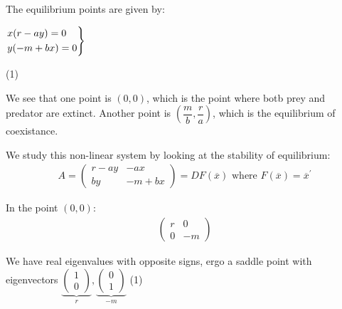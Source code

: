 \pagebreak
\noindent The equilibrium points are given by: \par
$\begin{rcases*}x(r-ay) = 0\\y(-m+bx) = 0\end{rcases*}$
 (1)
\par\bigskip
\noindent We see that one point is $(0,0)$, which is the point where botb prey and predator are extinct. Another point is $\left(\dfrac{m}{b}, \dfrac{r}{a}\right)$, which is the equilibrium of coexistance.
\par\bigskip
\noindent We study this non-linear system by looking at the stability of equilibrium:
\begin{equation*}
  \begin{gathered}
    A = \begin{pmatrix}r-ay&-ax\\by&-m+bx\end{pmatrix} = DF(\overline{x})\text{ where } F(\overline{x}) = \overline{x}^{\prime}
  \end{gathered}
\end{equation*}
\par\bigskip
\noindent In the point $(0,0)$:
\begin{equation*}
  \begin{gathered}
    \begin{pmatrix}r&0\\0&-m\end{pmatrix}
  \end{gathered}
\end{equation*}\par
\noindent We have real eigenvalues with opposite signs, ergo a saddle point with eigenvectors $\underbrace{\begin{pmatrix}1\\0\end{pmatrix}}_{\text{$r$}}, \underbrace{\begin{pmatrix}0\\1\end{pmatrix}}_{\text{$-m$}}$ (1)
